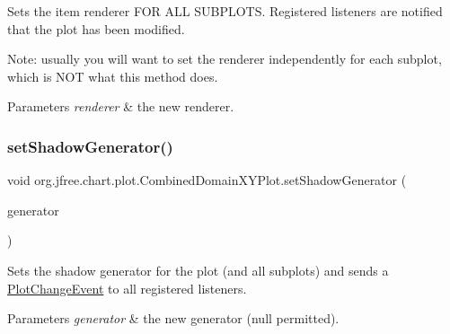 Sets the item renderer F\+OR A\+LL S\+U\+B\+P\+L\+O\+TS. Registered listeners are notified that the plot has been modified. 

Note\+: usually you will want to set the renderer independently for each subplot, which is N\+OT what this method does.


\begin{DoxyParams}{Parameters}
{\em renderer} & the new renderer. \\
\hline
\end{DoxyParams}
\mbox{\label{classorg_1_1jfree_1_1chart_1_1plot_1_1_combined_domain_x_y_plot_ac8c44bc2929c16385430361afa189ae6}} 
\subsubsection{\texorpdfstring{set\+Shadow\+Generator()}{setShadowGenerator()}}
{\footnotesize\ttfamily void org.\+jfree.\+chart.\+plot.\+Combined\+Domain\+X\+Y\+Plot.\+set\+Shadow\+Generator (\begin{DoxyParamCaption}\item[{\mbox{\hyperlink{interfaceorg_1_1jfree_1_1chart_1_1util_1_1_shadow_generator}{Shadow\+Generator}}}]{generator }\end{DoxyParamCaption})}

Sets the shadow generator for the plot (and all subplots) and sends a \mbox{\hyperlink{}{Plot\+Change\+Event}} to all registered listeners.


\begin{DoxyParams}{Parameters}
{\em generator} & the new generator ({\ttfamily null} permitted). \\
\hline
\end{DoxyParams}
\mbox{\label{classorg_1_1jfree_1_1chart_1_1plot_1_1_combined_domain_x_y_plot_a561639c8c710104403d3eb71799b4550}} 
